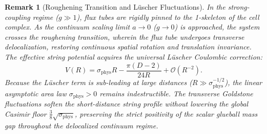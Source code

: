 \documentclass[11pt,reqno]{article}
\newtheorem{remark}[theorem]{Remark}
\begin{document}
\begin{remark}[Roughening Transition and Lüscher Fluctuations]
\label{rem:roughening_transition}
In the strong-coupling regime ($g \gg 1$), flux tubes are rigidly pinned to the 1-skeleton of the cell complex. As the continuum scaling limit $a \to 0$ ($g \to 0$) is approached, the system crosses the roughening transition, wherein the flux tube undergoes transverse delocalization, restoring continuous spatial rotation and translation invariance. The effective string potential acquires the universal Lüscher Coulombic correction:
\begin{equation}
    \label{eq:luescher_term}
    V(R) = \sigma_{\mathrm{phys}} R - \frac{\pi (D-2)}{24 R} + \mathcal{O}(R^{-2}).
\end{equation}
Because the Lüscher term is sub-leading at large distances ($R \gg \sigma_{\mathrm{phys}}^{-1/2}$), the linear asymptotic area law $\sigma_{\mathrm{phys}} > 0$ remains indestructible. The transverse Goldstone fluctuations soften the short-distance string profile without lowering the global Casimir floor $\frac{3}{8}\sqrt{\sigma_{\mathrm{phys}}}$, preserving the strict positivity of the scalar glueball mass gap throughout the delocalized continuum regime.
\end{remark}
\end{document}
